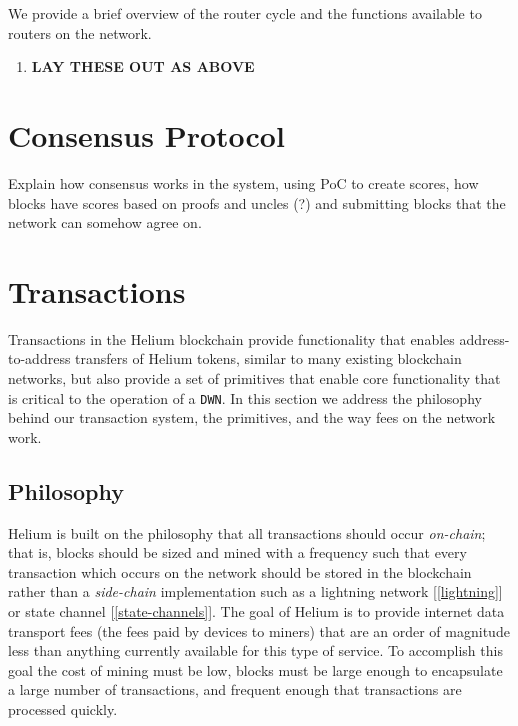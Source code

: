 \documentclass[letterpaper,11pt]{article}
\begin{document}
We provide a brief overview of the router cycle and the functions available to routers on the network.

\begin{enumerate}
  \item \textbf{LAY THESE OUT AS ABOVE}
\end{enumerate}

\newpage

\section{Consensus Protocol} \label{consensus}

Explain how consensus works in the system, using PoC to create scores, how blocks have scores based on proofs and uncles (?) and submitting blocks that the network can somehow agree on.

\newpage

\section{Transactions} \label{transactions}

Transactions in the Helium blockchain provide functionality that enables address-to-address transfers of Helium tokens, similar to many existing blockchain networks, but also provide a set of primitives that enable core functionality that is critical to the operation of a \verb|DWN|. In this section we address the philosophy behind our transaction system, the primitives, and the way fees on the network work.

\subsection{Philosophy}

Helium is built on the philosophy that all transactions should occur \emph{on-chain}; that is, blocks should be sized and mined with a frequency such that every transaction which occurs on the network should be stored in the blockchain rather than a \emph{side-chain} implementation such as a lightning network [\ref{lightning}] or state channel [\ref{state-channels}]. The goal of Helium is to provide internet data transport fees (the fees paid by devices to miners) that are an order of magnitude less than anything currently available for this type of service. To accomplish this goal the cost of mining must be low, blocks must be large enough to encapsulate a large number of transactions, and frequent enough that transactions are processed quickly.\newline
\end{document}
